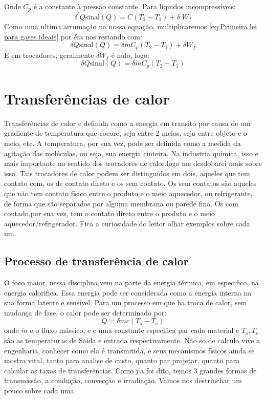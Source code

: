 Onde \(C_p\) é a constante à pressão constante. Para líquidos incompressíveis:
\begin{equation}\label{eq:Primeira lei para liquidos incompressiveis}
    \delta^\prime  Q \text{sinal}(Q)=C(T_2 - T_1)+\delta^\prime W_f
\end{equation}
Como uma ultima arrumação na nossa equação, multiplicaremos \eqref{eq:Primeira lei para gases
ideais} por \(\delta m\) nos restando com:
\begin{equation}\label{eq:Primeira lei para gases ideais não por massa}
    \delta  Q \text{sinal}(Q)=\delta m C_p (T_2 - T_1)+\delta W_f
\end{equation}
E em trocadores, geralmente \(\delta W_f\) é nulo, logo:
\begin{equation}\label{eq:Primeira lei para gases ideais não por massa trocador}
    \delta  Q \text{sinal}(Q)=\delta m C_p (T_2 - T_1)
\end{equation}

\section{Transferências de calor}
Transferências de calor e definida como a energia em transito por causa de um gradiente de
temperatura que cocore, seja entre 2 meios, seja entre objeto e o meio, etc. A temperatura, por sua
vez, pode ser definida como a medida da agitação das moléculas, ou seja, sua energia cinteira. Na
industria química, isso e mais importante no sentido dos trocadores de calor,logo me desdobarei mais
sobre isso. Tais trocadores de calor podem ser distinguidos em dois, aqueles que tem contato com, os
de contato direto e os sem contato. Os sem contatos são aqueles que não tem contato físico entre o
produto e o meio aquecedor, ou refrigerante, de forma que são separados por alguma membrana ou
parede fina. Os com contado,por sua vez, tem o contato direto entre o produto e o meio
aquecedor/refrigerador. Fica a curiosidade do leitor olhar exemplos sobre cada um.
\subsection{Processo de transferência de calor}

O foco maior, nessa disciplina,vem na parte da energia térmica, em especifico, na energia
calorifica. Essa energia pode ser considerada como a energia interna na sua forma latente e
sensível. Para um processo em que ha troca de calor, sem mudança de fase, o calor pode ser
determinado por:
\begin{equation}
    Q=\delta mc(T_s-T_e)
\end{equation}
onde \(\dot{m}\) e o fluxo mássico, \(c\) e uma constante especifica par cada material e \(T_s,T_e\)
são as temperaturas de Saida e entrada respectivamente. Não so de calculo vive a engenharia,
conhecer como ela é transmitida, e seus mecanismos físicos ainda se mostra vital, tanto para analise
de custo, quanto par projetar, quanto para calcular as taxas de transferências. Como j`a foi dito,
temos 3 grandes formas de transmissão, a condução, convecção e irradiação. Vamos nos destrinchar um
pouco sobre cada uma.

